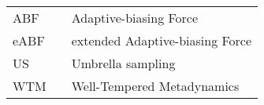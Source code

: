 \label{cha:symbols}

\begin{longtable}[l]{lcp{10cm}}
	ABF		&&  Adaptive-biasing Force \\
	eABF  &&  extended Adaptive-biasing Force \\
  US    &&  Umbrella sampling \\
	WTM   &&  Well-Tempered Metadynamics \\
\end{longtable}

